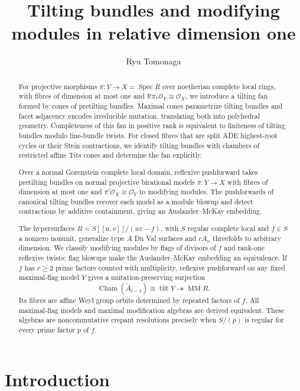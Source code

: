 \documentclass[a4paper,reqno]{amsart}
\title{Tilting bundles and modifying modules in relative dimension one}
\author{Ryu Tomonaga}
\def\O{\mathcal{O}}
\DeclareMathOperator{\Spec}{Spec}
\DeclareMathOperator{\tilt}{tilt}
\DeclareMathOperator{\MM}{MM}
\theoremstyle{definition}
\begin{document}
\begin{abstract}
For projective morphisms $\pi\colon Y\to X=\Spec R$ over noetherian complete local rings, with fibres of dimension at most one and $\mathbb R\pi_*\O_Y\cong\O_X$, we introduce a tilting fan formed by cones of pretilting bundles. Maximal cones parametrize tilting bundles and facet adjacency encodes irreducible mutation, translating both into polyhedral geometry. Completeness of this fan in positive rank is equivalent to finiteness of tilting bundles modulo line-bundle twists. For closed fibres that are split ADE highest-root cycles or their Stein contractions, we identify tilting bundles with chambers of restricted affine Tits cones and determine the fan explicitly.

Over a normal Gorenstein complete local domain, reflexive pushforward takes pretilting bundles on normal projective birational models $\pi\colon Y\to X$ with fibres of dimension at most one and $\pi^!\O_X\cong\O_Y$ to modifying modules. The pushforwards of canonical tilting bundles recover each model as a module blowup and detect contractions by additive containment, giving an Auslander--McKay embedding.

The hypersurfaces $R=S[[u,v]]/(uv-f)$, with $S$ regular complete local and $f\in S$ a nonzero nonunit, generalize type $A$ Du Val surfaces and $cA_n$ threefolds to arbitrary dimension. We classify modifying modules by flags of divisors of $f$ and rank-one reflexive twists; flag blowups make the Auslander--McKay embedding an equivalence. If $f$ has $r\ge2$ prime factors counted with multiplicity, reflexive pushforward on any fixed maximal-flag model $Y$ gives a mutation-preserving surjection
\[
\operatorname{Cham}(\widetilde A_{r-1})\cong\tilt Y
\twoheadrightarrow\MM R.
\]
Its fibres are affine Weyl group orbits determined by repeated factors of $f$. All maximal-flag models and maximal modification algebras are derived equivalent. These algebras are noncommutative crepant resolutions precisely when $S/(p)$ is regular for every prime factor $p$ of $f$.
\end{abstract}

\maketitle
\enlargethispage{3\baselineskip}
\tableofcontents


\section*{Introduction}
\end{document}
